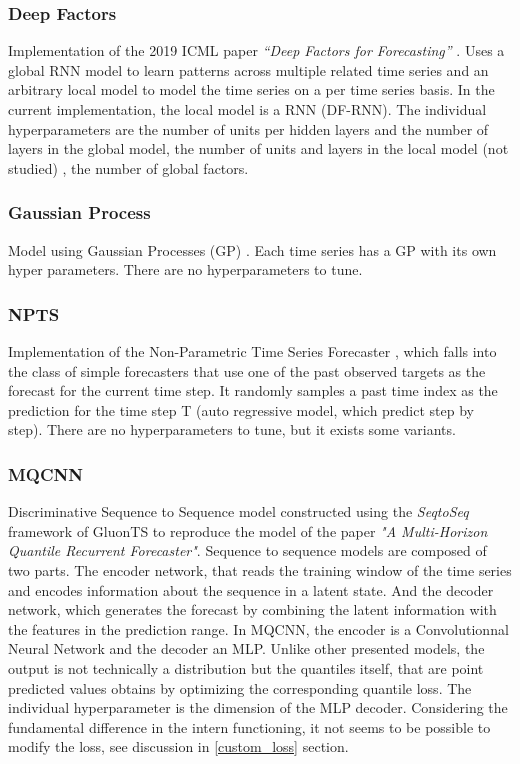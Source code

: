 \subsubsection{Deep Factors} \label{descr_deepfactor}
Implementation of the 2019 ICML paper \textit{“Deep Factors for Forecasting”} \cite{deepar_factor}.
Uses a global RNN model to learn patterns across multiple related time series and an arbitrary local model to model the time series on a per time series basis. 
In the current implementation, the local model is a RNN (DF-RNN).
The individual hyperparameters are the number of units per hidden layers and the number of layers in the global model, the number of units and layers in the local model (not studied)
, the number of global factors.

\subsubsection{Gaussian Process} \label{descr_gp}
Model using Gaussian Processes (GP) \cite{gp_paper}.
Each time series has a GP with its own hyper parameters.
There are no hyperparameters to tune.

\subsubsection{NPTS} \label{descr_npts}
Implementation of the Non-Parametric Time Series Forecaster \cite{npts_paper}, 
which falls into the class of simple forecasters that use one of the past observed targets as the forecast for
the current time step. It randomly samples a past time index as the prediction for the time step T (auto regressive model, which predict step by step).
There are no hyperparameters to tune, but it exists some variants.

\subsubsection{MQCNN} \label{descr_mqcnn}
Discriminative Sequence to Sequence model constructed using the \textit{SeqtoSeq} framework of GluonTS to reproduce the model of the 
paper \textit{"A Multi-Horizon Quantile Recurrent Forecaster"}\cite{mqcnn_paper}.
Sequence to sequence models are composed of two parts. The encoder network, that reads the training window of the time series 
and encodes information about  the  sequence  in  a  latent  state.
And the decoder network, which generates the forecast by combining the latent information with the features in the prediction range.
In MQCNN, the encoder is a Convolutionnal Neural Network and the decoder an MLP. Unlike other presented models, the output is not technically a distribution but the quantiles itself, that are point predicted values obtains by optimizing the corresponding quantile loss.
The individual hyperparameter is the  dimension of the MLP decoder.
Considering the fundamental difference in the intern functioning, it not seems to be possible to modify the loss, see discussion in \ref{custom_loss} section.

